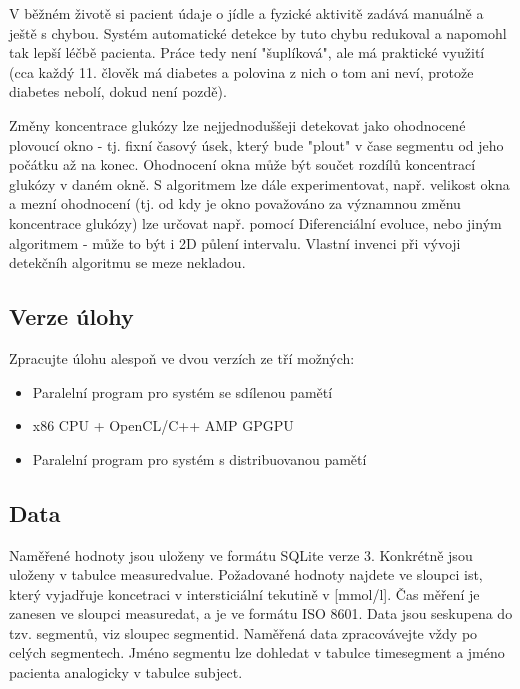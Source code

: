 \documentclass{article}
\begin{document}
	V běžném životě si pacient údaje o jídle a fyzické aktivitě zadává manuálně a ještě s chybou. 
	Systém automatické detekce by tuto chybu redukoval a napomohl tak lepší léčbě pacienta. 
	Práce tedy není "šuplíková", ale má praktické využití (cca každý 11. člověk má diabetes a polovina z nich o tom ani neví, protože diabetes nebolí, dokud není pozdě).
	
	Změny koncentrace glukózy lze nejjednoduššeji detekovat jako ohodnocené plovoucí okno - tj. fixní časový úsek, který bude "plout" v čase segmentu od jeho počátku až na konec.
	Ohodnocení okna může být součet rozdílů koncentrací glukózy v daném okně.
	S algoritmem lze dále experimentovat, např. velikost okna a mezní ohodnocení (tj. od kdy je okno považováno za významnou změnu koncentrace glukózy) lze určovat např. pomocí Diferenciální evoluce, nebo jiným algoritmem - může to být i 2D půlení intervalu. 
	Vlastní invenci při vývoji detekčníh algoritmu se meze nekladou.
	
	\subsection{Verze úlohy}
	Zpracujte úlohu alespoň ve dvou verzích ze tří možných:
	
	\begin{itemize}  
		\item Paralelní program pro systém se sdílenou pamětí
		\item x86 CPU + OpenCL/C++ AMP GPGPU
		\item Paralelní program pro systém s distribuovanou pamětí
	\end{itemize}
	
	
	\subsection{Data}
	Naměřené hodnoty jsou uloženy ve formátu SQLite verze 3.
	Konkrétně jsou uloženy v tabulce measuredvalue. 
	Požadované hodnoty najdete ve sloupci ist, který vyjadřuje koncetraci v intersticiální tekutině v [mmol/l]. 
	Čas měření je zanesen ve sloupci measuredat, a je ve formátu ISO 8601. Data jsou seskupena do tzv. segmentů, viz  sloupec segmentid. 
	Naměřená data zpracovávejte vždy po celých segmentech. 
	Jméno segmentu lze dohledat  v tabulce timesegment a jméno pacienta analogicky v tabulce subject.
	
\end{document}

